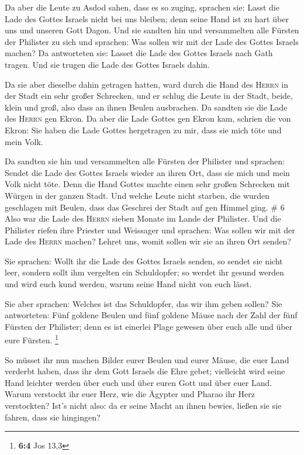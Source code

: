  Da aber die Leute zu Asdod sahen, dass es so zuging,
sprachen sie: Lasst die Lade des Gottes Israels nicht bei uns bleiben;
denn seine Hand ist zu hart über uns und unseren Gott Dagon.
 Und sie sandten hin und versammelten alle Fürsten der
Philister zu sich und sprachen: Was sollen wir mit der Lade des Gottes
Israels machen? Da antworteten sie: Lasset die Lade des Gottes Israels
nach Gath tragen. Und sie trugen die Lade des Gottes Israels dahin.

 Da sie aber dieselbe dahin getragen hatten, ward durch
die Hand des \textsc{Herrn} in der Stadt ein sehr großer Schrecken, und
er schlug die Leute in der Stadt, beide, klein und groß, also dass an
ihnen Beulen ausbrachen.  Da sandten sie die Lade des
\textsc{Herrn} gen Ekron. Da aber die Lade Gottes gen Ekron kam, schrien
die von Ekron: Sie haben die Lade Gottes hergetragen zu mir, dass sie
mich töte und mein Volk.

 Da sandten sie hin und versammelten alle Fürsten der
Philister und sprachen: Sendet die Lade des Gottes Israels wieder an
ihren Ort, dass sie mich und mein Volk nicht töte. Denn die Hand Gottes
machte einen sehr großen Schrecken mit Würgen in der ganzen Stadt.
 Und welche Leute nicht starben, die wurden geschlagen
mit Beulen, dass das Geschrei der Stadt auf gen Himmel ging. \# 6
 Also war die Lade des \textsc{Herrn} sieben Monate im
Lande der Philister.  Und die Philister riefen ihre
Priester und Weissager und sprachen: Was sollen wir mit der Lade des
\textsc{Herrn} machen? Lehret uns, womit sollen wir sie an ihren Ort
senden?

 Sie sprachen: Wollt ihr die Lade des Gottes Israels
senden, so sendet sie nicht leer, sondern sollt ihm vergelten ein
Schuldopfer; so werdet ihr gesund werden und wird euch kund werden,
warum seine Hand nicht von euch lässt.

 Sie aber sprachen: Welches ist das Schuldopfer, das wir
ihm geben sollen? Sie antworteten: Fünf goldene Beulen und fünf goldene
Mäuse nach der Zahl der fünf Fürsten der Philister; denn es ist einerlei
Plage gewesen über euch alle und über eure Fürsten. \footnote{\textbf{6:4}
  Jos 13,3}

 So müsset ihr nun machen Bilder eurer Beulen und eurer
Mäuse, die euer Land verderbt haben, dass ihr dem Gott Israels die Ehre
gebet; vielleicht wird seine Hand leichter werden über euch und über
euren Gott und über euer Land.  Warum verstockt ihr euer
Herz, wie die Ägypter und Pharao ihr Herz verstockten? Ist's nicht also:
da er seine Macht an ihnen bewies, ließen sie sie fahren, dass sie
hingingen?


